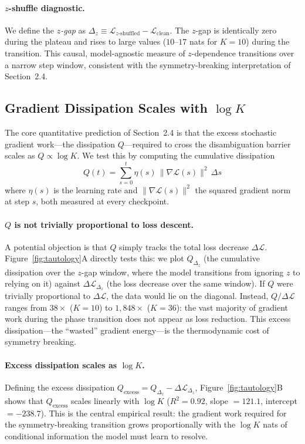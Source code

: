 \paragraph{$z$-shuffle diagnostic.}
We define the \emph{$z$-gap} as $\Delta_z \equiv \mathcal{L}_{z\text{-shuffled}} - \mathcal{L}_\text{clean}$. The $z$-gap is identically zero during the plateau and rises to large values ($10$--$17$ nats for $K{=}10$) during the transition. This causal, model-agnostic measure of $z$-dependence transitions over a narrow step window, consistent with the symmetry-breaking interpretation of Section~2.4.

\subsection{Gradient Dissipation Scales with $\log K$}

The core quantitative prediction of Section~2.4 is that the excess stochastic gradient work---the dissipation $Q$---required to cross the disambiguation barrier scales as $Q \propto \log K$. We test this by computing the cumulative dissipation
\[
Q(t) = \sum_{s=0}^{t} \eta(s) \, \|\nabla \mathcal{L}(s)\|^2 \, \Delta s
\]
where $\eta(s)$ is the learning rate and $\|\nabla \mathcal{L}(s)\|^2$ the squared gradient norm at step $s$, both measured at every checkpoint.

\paragraph{$Q$ is not trivially proportional to loss descent.}
A potential objection is that $Q$ simply tracks the total loss decrease $\Delta \mathcal{L}$. Figure~\ref{fig:tautology}A directly tests this: we plot $Q_{\Delta_z}$ (the cumulative dissipation over the $z$-gap window, where the model transitions from ignoring $z$ to relying on it) against $\Delta \mathcal{L}_{\Delta_z}$ (the loss decrease over the same window). If $Q$ were trivially proportional to $\Delta \mathcal{L}$, the data would lie on the diagonal. Instead, $Q/\Delta \mathcal{L}$ ranges from $38\times$ ($K{=}10$) to $1{,}848\times$ ($K{=}36$): the vast majority of gradient work during the phase transition does not appear as loss reduction. This excess dissipation---the ``wasted'' gradient energy---is the thermodynamic cost of symmetry breaking.

\paragraph{Excess dissipation scales as $\log K$.}
Defining the excess dissipation $Q_\text{excess} = Q_{\Delta_z} - \Delta \mathcal{L}_{\Delta_z}$, Figure~\ref{fig:tautology}B shows that $Q_\text{excess}$ scales linearly with $\log K$ ($R^2 = 0.92$, slope $= 121.1$, intercept $= -238.7$). This is the central empirical result: the gradient work required for the symmetry-breaking transition grows proportionally with the $\log K$ nats of conditional information the model must learn to resolve.

